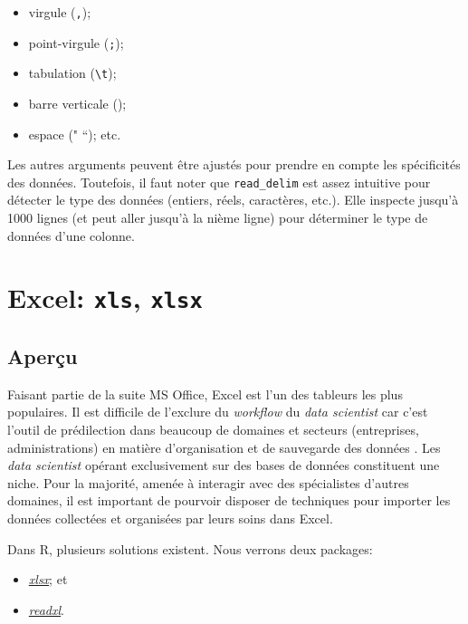 \documentclass[]{book}
\begin{document}
\begin{itemize}
\item
  virgule (\texttt{,});
\item
  point-virgule (\texttt{;});
\item
  tabulation (\texttt{\textbackslash{}t});
\item
  barre verticale (\texttt{\textbar{}});
\item
  espace (" ``); etc.
\end{itemize}

Les autres arguments peuvent être ajustés pour prendre en compte les
spécificités des données. Toutefois, il faut noter que
\texttt{read\_delim} est assez intuitive pour détecter le type des
données (entiers, réels, caractères, etc.). Elle inspecte jusqu'à 1000
lignes (et peut aller jusqu'à la nième ligne) pour déterminer le type de
données d'une colonne.

\section{\texorpdfstring{Excel: \texttt{xls},
\texttt{xlsx}}{Excel: xls, xlsx}}\label{excel-xls-xlsx}

\subsection{Aperçu}\label{apercu-2}

Faisant partie de la suite MS Office, Excel est l'un des tableurs les
plus populaires. Il est difficile de l'exclure du \emph{workflow} du
\emph{data scientist} car c'est l'outil de prédilection dans beaucoup de
domaines et secteurs (entreprises, administrations) en matière
d'organisation et de sauvegarde des données . Les \emph{data scientist}
opérant exclusivement sur des bases de données constituent une niche.
Pour la majorité, amenée à interagir avec des spécialistes d'autres
domaines, il est important de pourvoir disposer de techniques pour
importer les données collectées et organisées par leurs soins dans
Excel.

Dans R, plusieurs solutions existent. Nous verrons deux packages:

\begin{itemize}
\item
  \href{https://github.com/dragua/xlsx}{\emph{xlsx}}; et
\item
  \href{https://readxl.tidyverse.org/}{\emph{readxl}}.
\end{itemize}
\end{document}
